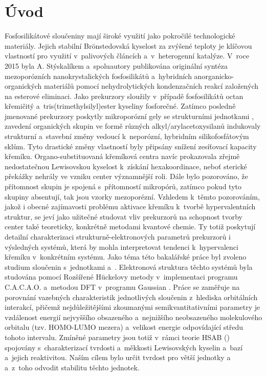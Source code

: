\documentclass[
  printed, %
  table,   %
  lof,     %
  lot,     %
  oneside,
]{fithesis3}
\begin{document}
\chapter{Úvod}
Fosfosilikátové sloučeniny mají široké využití jako pokročilé technologické materiály. Jejich stabilní Brönstedovská kyselost za zvýšené teploty je klíčovou vlastností pro využití v~palivových článcích a~v~heterogenní katalýze.\cite{korotcenkov2013handbook}\cite{Fougret2001295} V~roce 2015 byla A. Stýskalíkem a~spoluautory publikována originální syntéza mezoporózních  nanokrystalických  fosfosilikátů a~hybridních anorganicko-organických materiálů pomocí nehydrolytických kondenzačních reakcí založených na esterové eliminaci.\cite{1306716} Jako prekurzory sloužily v~případě fosfosilikátů octan křemičitý a~tris(trimethylsilyl)ester kyseliny fosforečné. Zatímco posledně jmenované prekurzory poskytly mikroporózní gely se strukturními jednotkami , zavedení organických skupin ve formě různých alkyl/arylacetoxysilanů indukovaly strukturní  a~stavební změny vedoucí k~neporózní, hybridním silikofosfátovým sklům.\cite{1316862} Tyto drastické změny vlastností byly připsány snížení zesíťovací kapacity křemíku. Organo-substituovaná křemíková centra navíc prokazovala zřejmě nedostatečnou Lewisovskou kyselost k~získání hexakoordinace, neboť sterické překážky nehrály ve vzniku  center významnější roli.  Dále bylo pozorováno, že přítomnost skupin  je spojená s~přítomností mikropórů, zatímco pokud tyto skupiny absentují, tak jsou vzorky mezoporézní.
Vzhledem k~těmto pozorováním, jakož i obecné zajímavosti problému aktivace křemíku k~tvorbě hypervalentních struktur,\cite{rendler2005hypervalent} se jeví jako užitečné studovat vliv prekurzorů na schopnost tvorby center  také teoreticky, konkrétně metodami kvantové chemie. Ty totiž poskytují detailní charakterizaci strukturně-elektronových parametrů prekurzorů i výsledných systémů, která by mohla interpretovat tendenci k~hypervalenci křemíku v~konkrétním systému. Jako téma této bakalářské práce byl zvoleno studium sloučenin s~jednotkami  a~. Elektronová struktura těchto systémů byla studována pomocí Rozšířené Hückelovy metody v~implementaci programu C.A.C.A.O.\cite{cacao} a~metodou DFT v~programu Gaussian \cite{g09}. Práce se zaměřuje na porovnání vazebných charakteristik jednotlivých sloučenin z~hlediska orbitálních interakcí, přičemž nejdůležitějšími zkoumanými semikvantitativními parametry je  vzdálenost energií nejvyššího obsazeného a~nejnižšího neobsazeného molekulového orbitalu (tzv. HOMO-LUMO mezera) a~velikost energie odpovídající středu tohoto intervalu. Zmíněné parametry jsou totiž v~rámci teorie HSAB () spojovány s~charakterizací tvrdosti a~měkkosti Lewisovských kyselin a~bazí a~jejich reaktivitou. \cite{pearson1986absolute} Naším cílem bylo určit tvrdost pro větší jednotky  a~ a~z~toho odvodit stabilitu těchto jednotek. 
\end{document}
